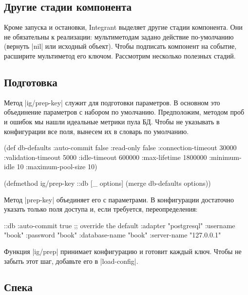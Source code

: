 \subsection{Другие стадии компонента}

Кроме запуска и остановки, Integrant выделяет другие стадии компонента. Они не
обязательны к реализации: мультиметодам задано действие по-умолчанию (вернуть
\spverb|nil| или исходный объект). Чтобы подписать компонент на событие,
расширите мультиметод его ключом. Рассмотрим несколько полезных стадий.

\subsection{Подготовка}

Метод \spverb|ig/prep-key| служит для подготовки параметров. В основном это
объединение параметров с набором по умолчанию. Предположим, методом проб и
ошибок мы нашли идеальные метрики пула БД. Чтобы не указывать в конфигурации все
поля, вынесем их в словарь по умолчанию.

\begin{english}
  \begin{clojure}
(def db-defaults
  {:auto-commit        false
   :read-only          false
   :connection-timeout 30000
   :validation-timeout 5000
   :idle-timeout       600000
   :max-lifetime       1800000
   :minimum-idle       10
   :maximum-pool-size  10})

(defmethod ig/prep-key ::db
  [_ options]
  (merge db-defaults options))
  \end{clojure}
\end{english}

Метод \spverb|prep-key| объединяет его с параметрами. В конфигурации достаточно
указать только поля доступа и, если требуется, переопределения:

\begin{english}
  \begin{clojure}
{::db {:auto-commit   true ;; override the default
       :adapter       "postgresql"
       :username      "book"
       :password      "book"
       :database-name "book"
       :server-name   "127.0.0.1"}}
  \end{clojure}
\end{english}

Функция \spverb|ig/prep| принимает конфигурацию и готовит каждый ключ. Чтобы не
забыть этот шаг, добавьте его в \spverb|load-config|.

\subsection{Спека}

